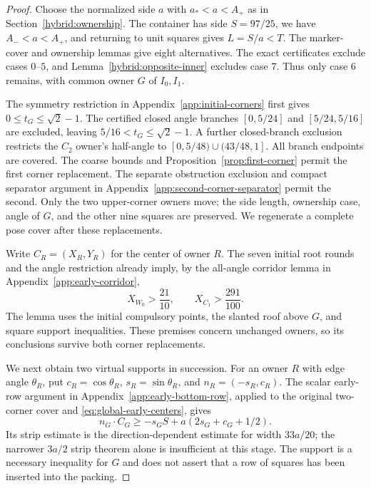\documentclass[11pt]{article}
\begin{document}
\begin{proof}
Choose the normalized side $a$ with
$a_*<a<A_+$ as in Section~\ref{hybrid:ownership}. The container has side
$S=97/25$, we have $A_-<a<A_+$, and returning to unit squares gives
$L=S/a<T$. The marker-cover and ownership lemmas give eight alternatives.
The exact certificates exclude cases $0$--$5$, and
Lemma~\ref{hybrid:opposite-inner} excludes case $7$. Thus only case $6$
remains, with common owner $G$ of $I_0,I_1$.

The symmetry restriction in Appendix~\ref{app:initial-corners} first gives
$0\le t_G\le\sqrt2-1$. The certified closed angle branches
$[0,5/24]$ and $[5/24,5/16]$ are excluded, leaving
$5/16<t_G\le\sqrt2-1$. A further closed-branch exclusion restricts
the $C_2$ owner's half-angle to
$[0,5/48)\cup(43/48,1]$. All branch endpoints are covered.
The coarse bounds and Proposition~\ref{prop:first-corner} permit the
first corner replacement. The separate obstruction exclusion and compact
separator argument in Appendix~\ref{app:second-corner-separator} permit
the second. Only the two upper-corner owners move; the side length,
ownership case, angle of $G$, and the other nine squares are preserved.
We regenerate a complete pose cover after these replacements.

Write $C_R=(X_R,Y_R)$ for the center of owner $R$. The seven initial
root rounds and the angle restriction already imply, by the all-angle
corridor lemma in Appendix~\ref{app:early-corridor},
\begin{equation}\label{eq:global-early-centers}
 X_{W_0}>\frac{21}{10},\qquad X_{C_1}>\frac{291}{100}.
\end{equation}
The lemma uses the initial compulsory points, the slanted roof above
$G$, and square support inequalities. These premises concern unchanged
owners, so its conclusions survive both corner replacements.

We next obtain two virtual supports in succession. For an owner $R$
with edge angle $\theta_R$, put
$c_R=\cos\theta_R$, $s_R=\sin\theta_R$, and
$n_R=(-s_R,c_R)$. The scalar early-row argument in
Appendix~\ref{app:early-bottom-row}, applied to the original two-corner
cover and \eqref{eq:global-early-centers}, gives
\begin{equation}\label{eq:global-early-row}
 n_G\cdot C_G\ge -s_GS+a(2s_G+c_G+1/2).
\end{equation}
Its strip estimate is the direction-dependent estimate for width
$33a/20$; the narrower $3a/2$ strip theorem alone is insufficient at
this stage. The support is a necessary inequality for $G$ and does not
assert that a row of squares has been inserted into the packing.


\end{proof}
\end{document}
